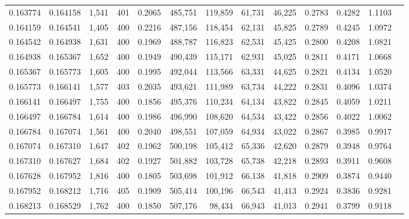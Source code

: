 \begin{tabular}{rrrrrrrrrrrrr}
0.163774 & 0.164158 & 1,541 & 401 &                                     0.2065 & 485,751 & 119,859 &  61,731 &  46,225 & 0.2783 & 0.4282 & 1.1103 \\
0.164159 & 0.164541 & 1,405 & 400 &                                     0.2216 & 487,156 & 118,454 &  62,131 &  45,825 & 0.2789 & 0.4245 & 1.0972 \\
0.164542 & 0.164938 & 1,631 & 400 &                                     0.1969 & 488,787 & 116,823 &  62,531 &  45,425 & 0.2800 & 0.4208 & 1.0821 \\
0.164938 & 0.165367 & 1,652 & 400 &                                     0.1949 & 490,439 & 115,171 &  62,931 &  45,025 & 0.2811 & 0.4171 & 1.0668 \\
0.165367 & 0.165773 & 1,605 & 400 &                                     0.1995 & 492,044 & 113,566 &  63,331 &  44,625 & 0.2821 & 0.4134 & 1.0520 \\
0.165773 & 0.166141 & 1,577 & 403 &                                     0.2035 & 493,621 & 111,989 &  63,734 &  44,222 & 0.2831 & 0.4096 & 1.0374 \\
0.166141 & 0.166497 & 1,755 & 400 &                                     0.1856 & 495,376 & 110,234 &  64,134 &  43,822 & 0.2845 & 0.4059 & 1.0211 \\
0.166497 & 0.166784 & 1,614 & 400 &                                     0.1986 & 496,990 & 108,620 &  64,534 &  43,422 & 0.2856 & 0.4022 & 1.0062 \\
0.166784 & 0.167074 & 1,561 & 400 &                                     0.2040 & 498,551 & 107,059 &  64,934 &  43,022 & 0.2867 & 0.3985 & 0.9917 \\
0.167074 & 0.167310 & 1,647 & 402 &                                     0.1962 & 500,198 & 105,412 &  65,336 &  42,620 & 0.2879 & 0.3948 & 0.9764 \\
0.167310 & 0.167627 & 1,684 & 402 &                                     0.1927 & 501,882 & 103,728 &  65,738 &  42,218 & 0.2893 & 0.3911 & 0.9608 \\
0.167628 & 0.167952 & 1,816 & 400 &                                     0.1805 & 503,698 & 101,912 &  66,138 &  41,818 & 0.2909 & 0.3874 & 0.9440 \\
0.167952 & 0.168212 & 1,716 & 405 &                                     0.1909 & 505,414 & 100,196 &  66,543 &  41,413 & 0.2924 & 0.3836 & 0.9281 \\
0.168213 & 0.168529 & 1,762 & 400 &                                     0.1850 & 507,176 &  98,434 &  66,943 &  41,013 & 0.2941 & 0.3799 & 0.9118 \\

\end{tabular}
